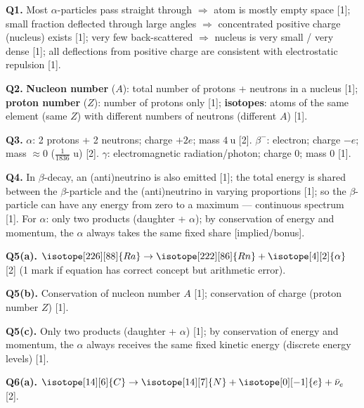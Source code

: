 \begin{markscheme}

\textbf{Q1.} Most $\alpha$-particles pass straight through $\Rightarrow$ atom is mostly empty space [1]; small fraction deflected through large angles $\Rightarrow$ concentrated positive charge (nucleus) exists [1]; very few back-scattered $\Rightarrow$ nucleus is very small / very dense [1]; all deflections from positive charge are consistent with electrostatic repulsion [1].

\vspace{0.5em}\textbf{Q2.} \textbf{Nucleon number} ($A$): total number of protons + neutrons in a nucleus [1]; \textbf{proton number} ($Z$): number of protons only [1]; \textbf{isotopes}: atoms of the same element (same $Z$) with different numbers of neutrons (different $A$) [1].

\vspace{0.5em}\textbf{Q3.} $\alpha$: 2 protons + 2 neutrons; charge $+2e$; mass $4\ \text{u}$ [2]. $\beta^-$: electron; charge $-e$; mass $\approx 0$ ($\tfrac{1}{1836}$ u) [2]. $\gamma$: electromagnetic radiation/photon; charge $0$; mass $0$ [1].

\vspace{0.5em}\textbf{Q4.} In $\beta$-decay, an (anti)neutrino is also emitted [1]; the total energy is shared between the $\beta$-particle and the (anti)neutrino in varying proportions [1]; so the $\beta$-particle can have any energy from zero to a maximum — continuous spectrum [1]. For $\alpha$: only two products (daughter + $\alpha$); by conservation of energy and momentum, the $\alpha$ always takes the same fixed share [implied/bonus].

\vspace{0.5em}\textbf{Q5(a).} $\isotope[226][88]{Ra} \to \isotope[222][86]{Rn} + \isotope[4][2]{\alpha}$ [2] (1 mark if equation has correct concept but arithmetic error).

\vspace{0.5em}\textbf{Q5(b).} Conservation of nucleon number $A$ [1]; conservation of charge (proton number $Z$) [1].

\vspace{0.5em}\textbf{Q5(c).} Only two products (daughter + $\alpha$) [1]; by conservation of energy and momentum, the $\alpha$ always receives the same fixed kinetic energy (discrete energy levels) [1].

\vspace{0.5em}\textbf{Q6(a).} $\isotope[14][6]{C} \to \isotope[14][7]{N} + \isotope[0][-1]{e} + \bar{\nu}_e$ [2].


\end{markscheme}
